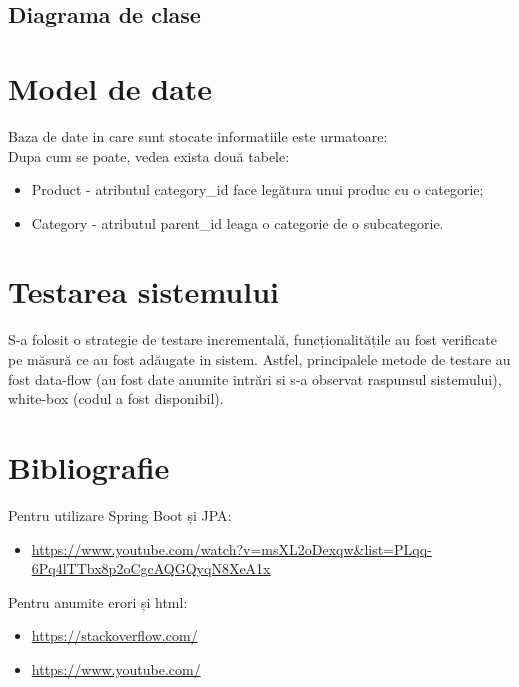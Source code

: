 \documentclass[11pt,a4paper,twoside,notitlepage]{article}
\begin{document}
\newpage
\subsection{Diagrama de clase}
\newpage

\section{Model de date}

Baza de date in care sunt stocate informatiile este urmatoare: \\
Dupa cum se poate, vedea exista două tabele:
\begin{itemize}
	\item Product - atributul category\_id face legătura unui produc cu o categorie;
	\item Category - atributul parent\_id leaga o categorie de o subcategorie.
\end{itemize}


\section{Testarea sistemului}

S-a folosit o strategie de testare incrementală, funcționalitățile au fost verificate pe măsură ce au fost adăugate in sistem. Astfel, principalele metode de testare au fost data-flow (au fost date anumite intrări si s-a observat raspunsul sistemului), white-box (codul a fost disponibil).

\section{Bibliografie}

Pentru utilizare Spring Boot și JPA:
\begin{itemize}
	\item \url{https://www.youtube.com/watch?v=msXL2oDexqw&list=PLqq-6Pq4lTTbx8p2oCgcAQGQyqN8XeA1x}  \\
\end{itemize}
Pentru anumite erori și html:
\begin{itemize}
	\item \url{https://stackoverflow.com/}
	\item \url{https://www.youtube.com/}	
\end{itemize}
\end{document}

